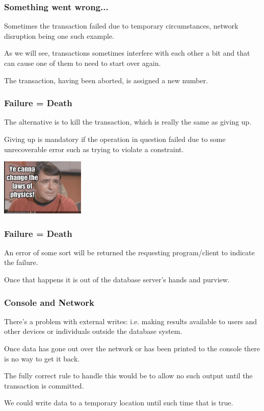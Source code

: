 \begin{frame}
\frametitle{Something went wrong...}


Sometimes the transaction failed due to temporary circumstances, network disruption being one such example. 

As we will see, transactions sometimes interfere with each other a bit and that can cause one of them to need to start over again. 

The transaction, having been aborted, is assigned a new number.

\end{frame}

\begin{frame}
\frametitle{Failure = Death}

The alternative is to kill the transaction, which is really the same as giving up. 

Giving up is mandatory if the operation in question failed due to some unrecoverable error such as trying to violate a constraint.

\begin{center}
	\includegraphics[width=0.3\textwidth]{images/physics.png}
\end{center}

\end{frame}

\begin{frame}
\frametitle{Failure = Death}

 An error of some sort will be returned the requesting program/client to indicate the failure. 
 
 Once that happens it is out of the database server's hands and purview.
\end{frame}



\begin{frame}
\frametitle{Console and Network}

There's a problem with external writes: i.e. making results available to users and other devices or individuals outside the database system. 

Once data has gone out over the network or has been printed to the console there is no way to get it back. 

The fully correct rule to handle this would be to allow no such output until the transaction is committed. 

We could write data to a temporary location until such time that is true. 


\end{frame}

